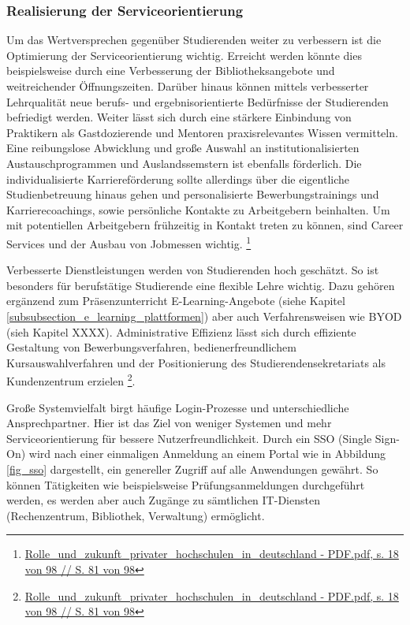 \subsubsection{Realisierung der Serviceorientierung}
\label{realisierung_der_serviceorientierung}
Um das Wertversprechen gegenüber Studierenden weiter zu verbessern ist die Optimierung der Serviceorientierung wichtig. Erreicht werden könnte dies beispielsweise durch eine Verbesserung der Bibliotheksangebote und weitreichender Öffnungszeiten. Darüber hinaus können mittels verbesserter Lehrqualität neue berufs- und ergebnisorientierte Bedürfnisse der Studierenden befriedigt werden. Weiter lässt sich durch eine stärkere Einbindung von Praktikern als Gastdozierende und Mentoren praxisrelevantes Wissen vermitteln. Eine reibungslose Abwicklung und große Auswahl an institutionalisierten Austauschprogrammen und Auslandssemstern ist ebenfalls förderlich. Die individualisierte Karriereförderung sollte allerdings über die eigentliche Studienbetreuung hinaus gehen und personalisierte Bewerbungstrainings und Karrierecoachings, sowie persönliche Kontakte zu Arbeitgebern beinhalten. Um mit potentiellen Arbeitgebern frühzeitig in Kontakt treten zu können, sind Career Services und der Ausbau von Jobmessen wichtig. \footnote{\url{Rolle_und_zukunft_privater_hochschulen_in_deutschland - PDF.pdf, s. 18 von 98 // S. 81 von 98}}

Verbesserte Dienstleistungen werden von Studierenden hoch geschätzt. So ist besonders für berufstätige Studierende eine flexible Lehre wichtig. Dazu gehören ergänzend zum Präsenzunterricht E-Learning-Angebote (siehe Kapitel \ref{subsubsection_e_learning_plattformen}) aber auch Verfahrensweisen wie BYOD (sieh Kapitel XXXX). Administrative Effizienz lässt sich durch effiziente Gestaltung von Bewerbungsverfahren, bedienerfreundlichem Kursauswahlverfahren und der Positionierung des Studierendensekretariats als Kundenzentrum erzielen \footnote{\url{Rolle_und_zukunft_privater_hochschulen_in_deutschland - PDF.pdf, s. 18 von 98 // S. 81 von 98}}.

Große Systemvielfalt birgt häufige Login-Prozesse und unterschiedliche Ansprechpartner. Hier ist das Ziel von weniger Systemen und mehr Serviceorientierung für bessere Nutzerfreundlichkeit. Durch ein SSO (Single Sign-On) wird nach einer einmaligen Anmeldung an einem Portal wie in Abbildung \ref{fig_sso} dargestellt, ein genereller Zugriff auf alle Anwendungen gewährt. So können Tätigkeiten wie beispielsweise Prüfungsanmeldungen durchgeführt werden, es werden aber auch Zugänge zu sämtlichen IT-Diensten (Rechenzentrum, Bibliothek, Verwaltung) ermöglicht.

